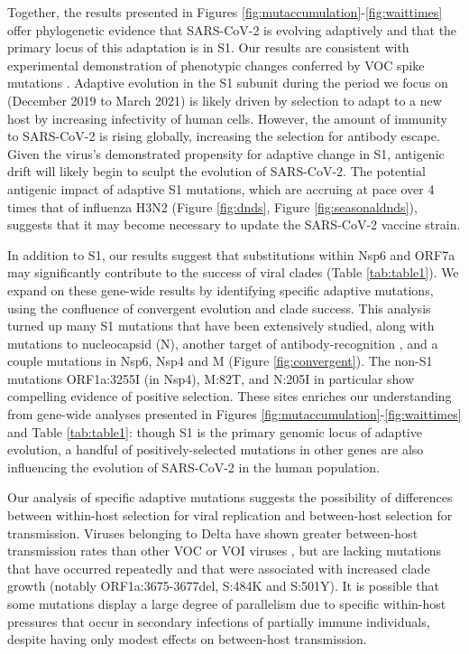\documentclass[11pt,oneside,letterpaper]{article}
\begin{document}
Together, the results presented in Figures \ref{fig:mutaccumulation}-\ref{fig:waittimes} offer phylogenetic evidence that SARS-CoV-2 is evolving adaptively and that the primary locus of this adaptation is in S1.
Our results are consistent with experimental demonstration of phenotypic changes conferred by VOC spike mutations \cite{Wang2021-dm, Greaney2021-jn, Li2020-jd, Liu2021-ne}.
Adaptive evolution in the S1 subunit during the period we focus on (December 2019 to March 2021) is likely driven by selection to adapt to a new host by increasing infectivity of human cells. 
However, the amount of immunity to SARS-CoV-2 is rising globally, increasing the selection for antibody escape.
Given the virus's demonstrated propensity for adaptive change in S1, antigenic drift will likely begin to sculpt the evolution of SARS-CoV-2.
The potential antigenic impact of adaptive S1 mutations, which are accruing at pace over 4 times that of influenza H3N2 (Figure \ref{fig:dnds}, Figure \ref{fig:seasonaldnds}), suggests that it may become necessary to update the SARS-CoV-2 vaccine strain.

In addition to S1, our results suggest that substitutions within Nsp6 and ORF7a may significantly contribute to the success of viral clades (Table \ref{tab:table1}).
We expand on these gene-wide results by identifying specific adaptive mutations, using the confluence of convergent evolution and clade success.
This analysis turned up many S1 mutations that have been extensively studied, along with mutations to nucleocapsid (N), another target of antibody-recognition \cite{Kang2021-pe}, and a couple mutations in Nsp6, Nsp4 and M (Figure \ref{fig:convergent}).
The non-S1 mutations ORF1a:3255I (in Nsp4), M:82T, and N:205I in particular show compelling evidence of positive selection.
These sites enriches our understanding from gene-wide analyses presented in Figures \ref{fig:mutaccumulation}-\ref{fig:waittimes} and Table \ref{tab:table1}: though S1 is the primary genomic locus of adaptive evolution, a handful of positively-selected mutations in other genes are also influencing the evolution of SARS-CoV-2 in the human population.

Our analysis of specific adaptive mutations suggests the possibility of differences between within-host selection for viral replication and between-host selection for transmission.
Viruses belonging to Delta have shown greater between-host transmission rates than other VOC or VOI viruses \cite{Campbell2021-cx}, but are lacking mutations that have occurred repeatedly and that were associated with increased clade growth (notably ORF1a:3675-3677del, S:484K and S:501Y).
It is possible that some mutations display a large degree of parallelism due to specific within-host pressures that occur in secondary infections of partially immune individuals, despite having only modest effects on between-host transmission.
\end{document}
